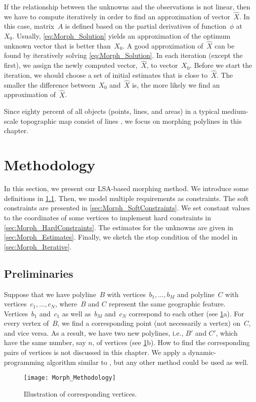If the relationship 
between the unknowns and the observations is not linear,
then we have to compute iteratively 
in order to find an approximation of vector~$\hat{X}$. 
In this case, matrix~$A$ is defined based on 
the partial derivatives of function~$\phi$ at~$X_0$.
Usually, \eq\ref{eq:Morph_Solution} yields 
an approximation of the optimum 
unknown vector that is better than~$X_0$. 
A good approximation of~$\hat{X}$ can be 
found by iteratively solving \eq\ref{eq:Morph_Solution}. 
In each iteration (except the first),
we assign the newly computed vector,~$\hat{X}$, 
to vector~$X_0$.
Before we start the iteration, we should choose
a set of initial estimates that is close to~$\hat{X}$. 
The smaller the difference between~$X_0$ and~$\hat{X}$ is,
the more likely we find an approximation of~$\hat{X}$.

Since eighty percent of all objects (points, lines, and areas) 
in a typical medium-scale topographic map consist of lines
\parencite{Muller1991}, 
we focus on morphing polylines in this chapter.


\section{Methodology}
\label{sec:Morph_Methodology}
In this section, we present our LSA-based morphing method. 
We introduce some 
definitions in \sect\ref{sec:Morph_Preliminaries}. 
Then, we model multiple requirements as constraints. 
The soft constraints are presented in 
\sect\ref{sec:Morph_SoftConstraints}. 
We set constant values to the coordinates of some 
vertices to implement hard constraints in 
\sect\ref{sec:Morph_HardConstraints}. 
The estimates for the unknowns are given in 
\sect\ref{sec:Morph_Estimates}. 
Finally, we sketch the stop condition of the model in 
\sect\ref{sec:Morph_Iterative}.

\subsection{Preliminaries}
\label{sec:Morph_Preliminaries}
Suppose that we have
polyline~$B$ with vertices~$b_1, \dots,b_M$ and 
polyline~$C$ with vertices~$c_1,\dots,c_N$, 
where~$B$ and $C$ represent the same geographic feature. 
Vertices~$b_1$ and~$c_1$ as well as~$b_M$ and~$c_N$ correspond 
to each other (see \fig\ref{fig:Morph_Injection}a). 
For every vertex of~$B$, we find a corresponding point (not 
necessarily a vertex) on~$C$, and vice versa. 
As a result, we have two new polylines, i.e., $B'$ and $C'$,
which have the same number, say $n$, of vertices
(see \fig\ref{fig:Morph_Injection}b).
How to find the corresponding pairs of vertices 
is not discussed in this chapter. 
We apply a dynamic-programming algorithm similar to
\textcite{Noellenburg2008}, 
but any other method could be used as well.
\begin{figure}[tb]
\centering	
\texttt{[image: Morph\_Methodology]}
\caption{Illustration of corresponding vertices.}
\label{fig:Morph_Injection}
\end{figure}



